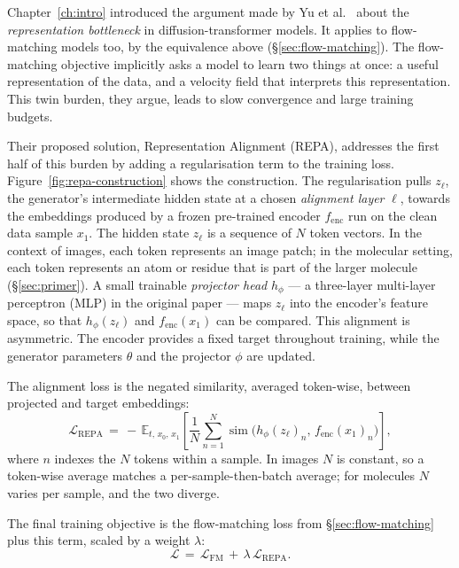 \documentclass[12pt,a4paper,twoside]{report}
\begin{document}
Chapter~\ref{ch:intro} introduced the argument made by Yu et al.~\cite{REPA} about the \emph{representation bottleneck} in diffusion-transformer models. It applies to flow-matching models too, by the equivalence above (\S\ref{sec:flow-matching}). The flow-matching objective implicitly asks a model to learn two things at once: a useful representation of the data, and a velocity field that interprets this representation. This twin burden, they argue, leads to slow convergence and large training budgets.

Their proposed solution, Representation Alignment (REPA), addresses the first half of this burden by adding a regularisation term to the training loss. Figure~\ref{fig:repa-construction} shows the construction. The regularisation pulls $z_\ell$, the generator's intermediate hidden state at a chosen \emph{alignment layer} $\ell$, towards the embeddings produced by a frozen pre-trained encoder $f_{\text{enc}}$ run on the clean data sample $x_1$. The hidden state $z_\ell$ is a sequence of $N$ token vectors. In the context of images, each token represents an image patch; in the molecular setting, each token represents an atom or residue that is part of the larger molecule (\S\ref{sec:primer}). A small trainable \emph{projector head} $h_\phi$ --- a three-layer multi-layer perceptron (MLP) in the original paper --- maps $z_\ell$ into the encoder's feature space, so that $h_\phi(z_\ell)$ and $f_{\text{enc}}(x_1)$ can be compared. This alignment is asymmetric. The encoder provides a fixed target throughout training, while the generator parameters $\theta$ and the projector $\phi$ are updated.

The alignment loss is the negated similarity, averaged token-wise, between projected and target embeddings:
\[
  \mathcal{L}_{\text{REPA}} \,=\, -\, \mathbb{E}_{t,\, x_0,\, x_1} \left[ \frac{1}{N} \sum_{n=1}^{N} \operatorname{sim}\bigl( h_\phi(z_\ell)_n,\, f_{\text{enc}}(x_1)_n \bigr) \right],
\]
where $n$ indexes the $N$ tokens within a sample. In images $N$ is constant, so a token-wise average matches a per-sample-then-batch average; for molecules $N$ varies per sample, and the two diverge.

The final training objective is the flow-matching loss from \S\ref{sec:flow-matching} plus this term, scaled by a weight $\lambda$:
\[
  \mathcal{L} \,=\, \mathcal{L}_{\text{FM}} \,+\, \lambda\, \mathcal{L}_{\text{REPA}}.
\]
\end{document}
